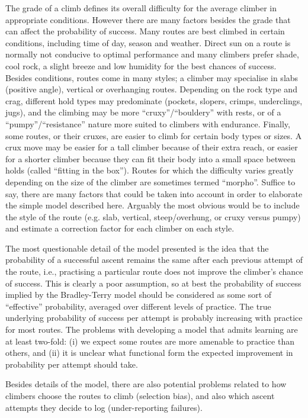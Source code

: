 \documentclass[12pt]{article}
\begin{document}
The grade of a climb defines its overall difficulty for the average climber in appropriate conditions. However there are many factors besides the grade that can affect the probability of success. Many routes are best climbed in certain conditions, including time of day, season and weather. Direct sun on a route is normally not conducive to optimal performance and many climbers prefer shade, cool rock, a slight breeze and low humidity for the best chances of success. Besides conditions, routes come in many styles; a climber may specialise in slabs (positive angle), vertical or overhanging routes. Depending on the rock type and crag, different hold types may predominate (pockets, slopers, crimps, underclings, jugs), and the climbing may be more ``cruxy''/``bouldery'' with rests, or of a ``pumpy''/``resistance'' nature more suited to climbers with endurance. Finally, some routes, or their cruxes, are easier to climb for certain body types or sizes. A crux move may be easier for a tall climber because of their extra reach, or easier for a shorter climber because they can fit their body into a small space between holds (called ``fitting in the box''). Routes for which the difficulty varies greatly depending on the size of the climber are sometimes termed ``morpho''. Suffice to say, there are many factors that could be taken into account in order to elaborate the simple model described here. Arguably the most obvious would be to include the style of the route (e.g. slab, vertical, steep/overhung, or cruxy versus pumpy) and estimate a correction factor for each climber on each style.

The most questionable detail of the model presented is the idea that the probability of a successful ascent remains the same after each previous attempt of the route, i.e., practising a particular route does not improve the climber's chance of success. This is clearly a poor assumption, so at best the probability of success implied by the Bradley-Terry model should be considered as some sort of ``effective'' probability, averaged over different levels of practice. The true underlying probability of success per attempt is probably increasing with practice for most routes. The problems with developing a model that admits learning are at least two-fold: (i) we expect some routes are more amenable to practice than others, and (ii) it is unclear what functional form the expected improvement in probability per attempt should take.

Besides details of the model, there are also potential problems related to how climbers choose the routes to climb (selection bias), and also which ascent attempts they decide to log (under-reporting failures).
\end{document}
